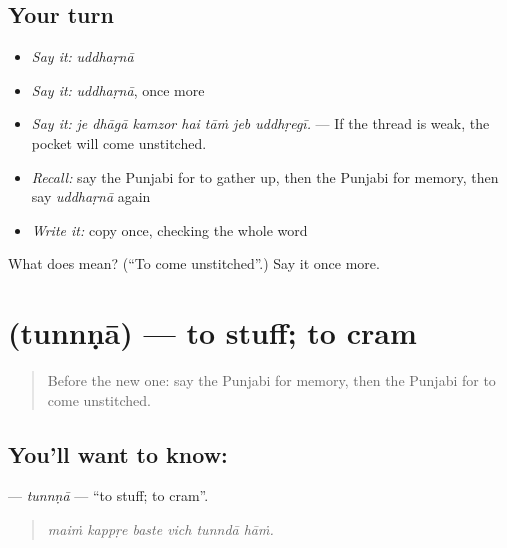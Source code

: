 \subsection*{Your turn}
\begin{itemize}
\raggedright
  \item \emph{Say it:} \emph{uddhaṛnā}
  \item \emph{Say it:} \emph{uddhaṛnā}, once more
  \item \emph{Say it:} \emph{je dhāgā kamzor hai tāṁ jeb uddhṛegī.} — If the thread is weak, the pocket will come unstitched.
  \item \emph{Recall:} say the Punjabi for to gather up, then the Punjabi for memory, then say \emph{uddhaṛnā} again
  \item \emph{Write it:} copy \textbf{} once, checking the whole word
\end{itemize}

\begin{tcolorbox}[breakable,colback=teal!4,colframe=teal!35!black,title={Before you move on}]
What does  mean? (\textquotedblleft{}To come unstitched\textquotedblright{}.) Say it once more.
\end{tcolorbox}
\section[\texorpdfstring{\pa{ਤੁੰਨਣਾ} (tunnṇā)}{ਤੁੰਨਣਾ (tunnṇā)}]{ (tunnṇā) — to stuff; to cram}

\label{lesson:PA-C232-tunnna}



\begin{quote}
Before the new one: say the Punjabi for memory, then the Punjabi for to come unstitched.
\end{quote}

\subsection*{You'll want to know: }
\textbf{} — \emph{tunnṇā} — \textquotedblleft{}to stuff; to cram\textquotedblright{}.

\begin{quote}
     
\end{quote}

\begin{quote}
\emph{maiṁ kappṛe baste vich tunndā hāṁ.}
\end{quote}

